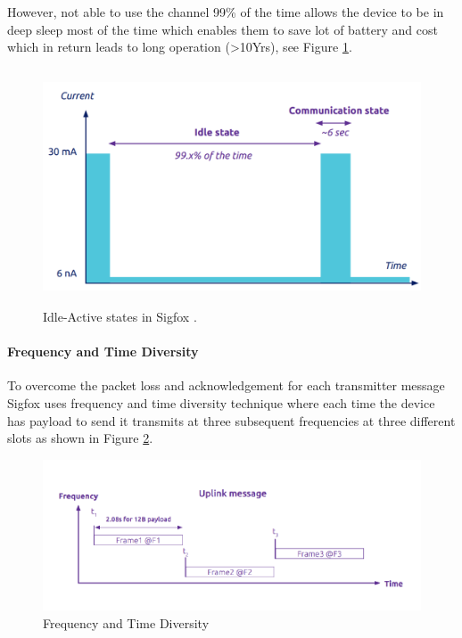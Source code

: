 \documentclass[12pt]{article}
\begin{document}
However, not able to use the channel 99\% of the time allows the device to be in deep sleep most of the time which enables them to save lot of battery and cost which in return leads to long operation (>10Yrs), see Figure \ref{fig:Idle-Active states in Sigfox}.
\begin{figure}[H]
\centering
  \includegraphics[width=\columnwidth, height=7cm, keepaspectratio]{Images/ActiveSleepSigfox.pdf}
  \centering
  \caption{Idle-Active states in Sigfox  \cite{SigfoxTechnicalDoc}.}
  \label{fig:Idle-Active states in Sigfox}
\end{figure}

\paragraph{Frequency and Time Diversity}
To overcome the packet loss and acknowledgement for each transmitter message Sigfox uses frequency and time diversity technique where each time the device has payload to send it transmits at three subsequent frequencies at three different slots as shown in Figure \ref{fig:Frequency and Time Diversity}.

\begin{figure}[H]
\centering
  \includegraphics[width=\columnwidth]{Images/frequency_time_diversity.pdf}
  \centering
  \caption{Frequency and Time Diversity  \cite{SigfoxTechnicalDoc}}
  \label{fig:Frequency and Time Diversity}
\end{figure}
\end{document}
